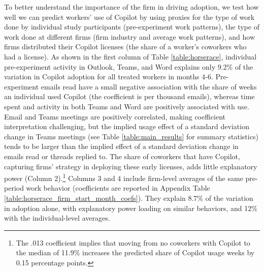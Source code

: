 \documentclass{article}
\begin{document}
To better understand the importance of the firm in driving adoption, we test how well we can predict workers' use of Copilot by using proxies for the type of work done by individual study participants (pre-experiment work patterns), the type of work done at different firms (firm industry and average work patterns), and how firms distributed their Copilot licenses (the share of a worker's coworkers who had a license). As shown in the first column of Table \ref{table:horserace}, individual pre-experiment activity in Outlook, Teams, and Word explains only 9.2\% of the variation in Copilot adoption for all treated workers in months 4-6. Pre-experiment emails read have a small negative association with the share of weeks an individual used Copilot (the coefficient is per thousand emails), whereas time spent and activity in both Teams and Word are positively associated with use.  Email and Teams meetings are positively correlated, making coefficient interpretation challenging, but the implied usage effect of a standard deviation change in Teams meetings (see Table \ref{table:main_results} for summary statistics) tends to be larger than the implied effect of a standard deviation change in emails read or threads replied to. The share of coworkers that have Copilot, capturing firms' strategy in deploying these early licenses, adds little explanatory power (Column 2).\footnote{The .013 coefficient implies that moving from no coworkers with Copilot to the median of 11.9\% increases the predicted share of Copilot usage weeks by 0.15 percentage points.}  Columns 3 and 4 include firm-level averages of the same pre-period work behavior (coefficients are reported in Appendix Table \ref{table:horserace_firm_start_month_coefs}). They explain 8.7\% of the variation in adoption alone, with explanatory power loading on similar behaviors, and 12\% with the individual-level averages. 
\end{document}
